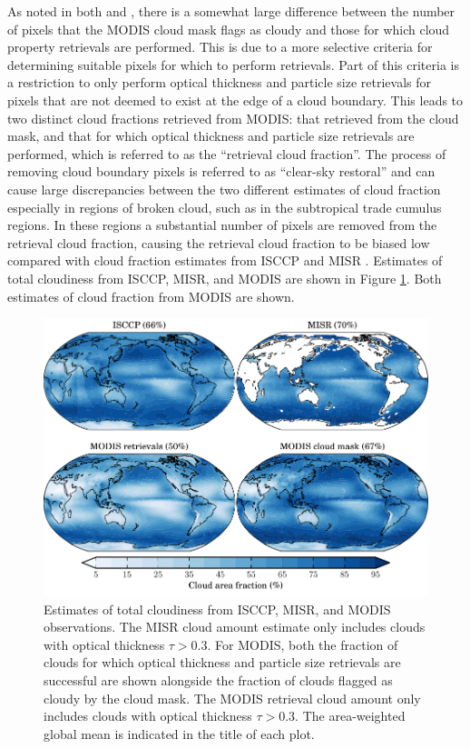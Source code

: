 As noted in both \cite{marchand_et_al_2010} and \cite{pincus_et_al_2011}, there is a somewhat large difference between the number of pixels that the MODIS cloud mask flags as cloudy and those for which cloud property retrievals are performed. This is due to a more selective criteria for determining suitable pixels for which to perform retrievals. Part of this criteria is a restriction to only perform optical thickness and particle size retrievals for pixels that are not deemed to exist at the edge of a cloud boundary. This leads to two distinct cloud fractions retrieved from MODIS: that retrieved from the cloud mask, and that for which optical thickness and particle size retrievals are performed, which is referred to as the ``retrieval cloud fraction''. The process of removing cloud boundary pixels is referred to as ``clear-sky restoral'' and can cause large discrepancies between the two different estimates of cloud fraction especially in regions of broken cloud, such as in the subtropical trade cumulus regions. In these regions a substantial number of pixels are removed from the retrieval cloud fraction, causing the retrieval cloud fraction to be biased low compared with cloud fraction estimates from ISCCP and MISR \citep{marchand_et_al_2010,pincus_et_al_2011}. Estimates of total cloudiness from ISCCP, MISR, and MODIS are shown in Figure \ref{clt_retrievals_map}. Both estimates of cloud fraction from MODIS are shown.
\begin{figure}
    \centering
    \includegraphics{../graphics/clt_retrievals_map.pdf}
    \caption[Estimates of total cloudiness from ISCCP, MISR, and MODIS observations.]{Estimates of total cloudiness from ISCCP, MISR, and MODIS observations. The MISR cloud amount estimate only includes clouds with optical thickness $\tau>0.3$. For MODIS, both the fraction of clouds for which optical thickness and particle size retrievals are successful are shown alongside the fraction of clouds flagged as cloudy by the cloud mask. The MODIS retrieval cloud amount only includes clouds with optical thickness $\tau>0.3$. The area-weighted global mean is indicated in the title of each plot.}
    \label{clt_retrievals_map}
\end{figure}

